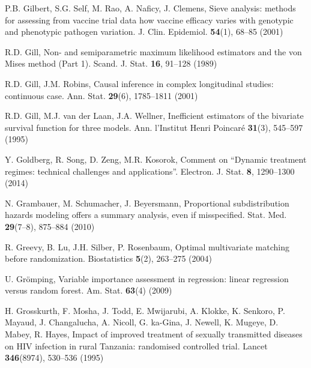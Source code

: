 \begin{list}{}{\setlength{\leftmargin}{2.1em}\setlength{\labelwidth}{0pt}
  \setlength{\labelsep}{0pt}\setlength{\itemindent}{-2.1em}
  \setlength{\parsep}{0pt}\setlength{\itemsep}{2pt}\setlength{\topsep}{0pt}}
\item\label{refentry:REF124}P.B. Gilbert, S.G. Self, M. Rao, A. Naficy, J. Clemens, Sieve analysis: methods for assessing from vaccine trial data how vaccine efficacy varies with genotypic and phenotypic pathogen variation. J. Clin. Epidemiol. \textbf{54}(1), 68--85 (2001)\label{refend:REF124}
\item\label{refentry:REF125}R.D. Gill, Non- and semiparametric maximum likelihood estimators and the von Mises method (Part 1). Scand. J. Stat. \textbf{16}, 91--128 (1989)\label{refend:REF125}
\item\label{refentry:REF126}R.D. Gill, J.M. Robins, Causal inference in complex longitudinal studies: continuous case. Ann. Stat. \textbf{29}(6), 1785--1811 (2001)\label{refend:REF126}
\item\label{refentry:REF127}R.D. Gill, M.J. van der Laan, J.A. Wellner, Inefficient estimators of the bivariate survival function for three models. Ann. l'Institut Henri Poincaré \textbf{31}(3), 545--597 (1995)\label{refend:REF127}
\item\label{refentry:REF128}Y. Goldberg, R. Song, D. Zeng, M.R. Kosorok, Comment on ``Dynamic treatment regimes: technical challenges and applications''. Electron. J. Stat. \textbf{8}, 1290--1300 (2014)\label{refend:REF128}
\item\label{refentry:REF129}N. Grambauer, M. Schumacher, J. Beyersmann, Proportional subdistribution hazards modeling offers a summary analysis, even if misspecified. Stat. Med. \textbf{29}(7--8), 875--884 (2010)\label{refend:REF129}
\item\label{refentry:REF130}R. Greevy, B. Lu, J.H. Silber, P. Rosenbaum, Optimal multivariate matching before randomization. Biostatistics \textbf{5}(2), 263--275 (2004)\label{refend:REF130}
\item\label{refentry:REF131}U. Grömping, Variable importance assessment in regression: linear regression versus random forest. Am. Stat. \textbf{63}(4) (2009)\label{refend:REF131}
\item\label{refentry:REF132}H. Grosskurth, F. Mosha, J. Todd, E. Mwijarubi, A. Klokke, K. Senkoro, P. Mayaud, J. Changalucha, A. Nicoll, G. ka-Gina, J. Newell, K. Mugeye, D. Mabey, R. Hayes, Impact of improved treatment of sexually transmitted diseases on HIV infection in rural Tanzania: randomised controlled trial. Lancet \textbf{346}(8974), 530--536 (1995)\label{refend:REF132}

\end{list}
